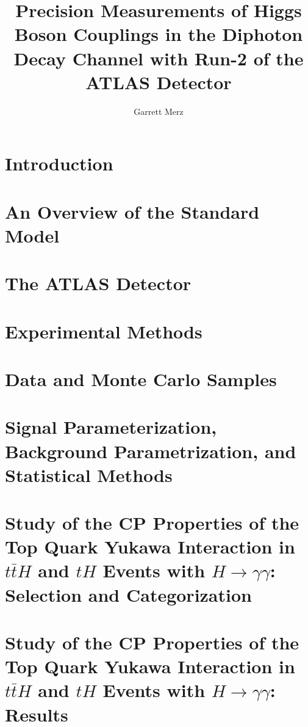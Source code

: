 \documentclass[thesis,openany]{./tex/thesis-umich}
\title{Precision Measurements of Higgs Boson Couplings in the Diphoton Decay Channel with Run-2 of the ATLAS Detector}
\author{Garrett Merz}
\begin{document}

\chapter{Introduction} \label{chap:intro}
	 

\chapter{An Overview of the Standard Model} \label{chap:theory_chapter}
	 

\chapter{The ATLAS Detector} \label{chap:detector_chapter}
	 

\chapter{Experimental Methods} \label{chap:methods_chapter}
	 

\chapter{Data and Monte Carlo Samples} \label{chap:datamc_chapter}
	 

\chapter{Signal Parameterization, Background Parametrization, and Statistical Methods} \label{chap:sigbkgparam}
	 

\chapter{Study of the CP Properties of the Top Quark Yukawa Interaction in $t\bar{t}H$ and $tH$ Events with $H \rightarrow \gamma \gamma$: Selection and Categorization} \label{chap:tthcp_chapter}
	 

\chapter{Study of the CP Properties of the Top Quark Yukawa Interaction in $t\bar{t}H$ and $tH$ Events with $H \rightarrow \gamma \gamma$: Results} \label{chap:tthcp_results}
	 
\end{document}
